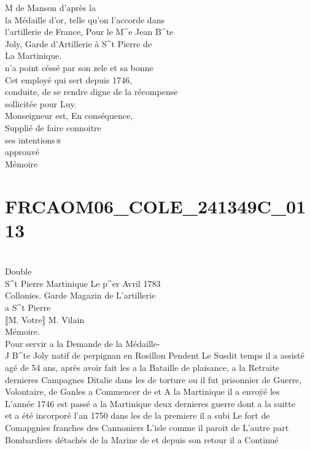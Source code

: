 \documentclass{article}
\begin{document}
\begin{pages}
M de Manson d'après la\\
la Médaille d'or, telle qu'on l'accorde dans\\
l'artillerie de France, Pour le M\^{}e Jean B\^{}te\\
Joly, Garde d'Artillerie à S\^{}t Pierre de\\
La Martinique.\\
n'a point céssé par son zele et sa bonne\\
Cet employé qui sert depuis 1746,\\
conduite, de se rendre digne de la récompense\\
sollicitée pour Luy.\\
Monseigneur est, En conséquence,\\
Supplié de faire connoitre\\
ses intentions※\\
approuvé
\pend\pstart
\\
Mémoire
\pend
\endnumbering\beginnumbering\section{FRCAOM06\_COLE\_241349C\_0113}\pstart
\\
Double\\
S\^{}t Pierre Martinique Le p\^{}er Avril 1783\\
Collonies. Garde Magazin de L'artillerie\\
a S\^{}t Pierre\\
⟦M. Votre⟧ M. Vilain\\
Mémoire.\\
Pour servir a la Demande de la Médaille-\\
J B\^{}te Joly natif de perpignan en Rosillon Pendent Le Susdit temps il a assisté\\
agé de 54 ans, après avoir fait les a la Bataille de plaisance, a la Retraite\\
dernieres Campagnes Ditalie dans les de torture ou il fut prisonnier de Guerre,\\
Volontaire, de Ganles a Commencer de et A la Martinique il a envoÿé les\\
L'année 1746 est passé a la Martinique deux dernieres guerre dont a la suitte\\
et a été incorporé l'an 1750 dans les de la premiere il a subi Le fort de\\
Comapgnies franches des Cannoniers L'isle comme il paroit de L'autre part\\
Bombardiers détachés de la Marine de et depuis son retour il a Continué\\

\end{pages}
\end{document}
